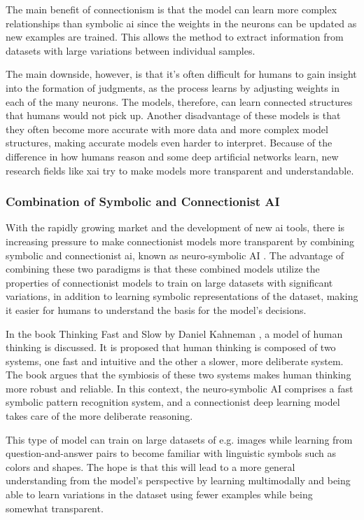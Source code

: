 The main benefit of connectionism is that the model can learn more complex relationships than symbolic \gls{ai} since the weights in the neurons can be updated as new examples are trained. This allows the method to extract information from datasets with large variations between individual samples.

The main downside, however, is that it's often difficult for humans to gain insight into the formation of judgments, as the process learns by adjusting weights in each of the many neurons. The models, therefore, can learn connected structures that humans would not pick up. Another disadvantage of these models is that they often become more accurate with more data and more complex model structures, making accurate models even harder to interpret. Because of the difference in how humans reason and some deep artificial networks learn, new research fields like \gls{xai} try to make models more transparent and understandable.


    \subsubsection{Combination of Symbolic and Connectionist AI}
    With the rapidly growing market and the development of new \gls{ai} tools, there is increasing pressure to make connectionist models more transparent by combining symbolic and connectionist \gls{ai}, known as neuro-symbolic AI \cite{valiantKnowledgeInfusionPursuit2008}. The advantage of combining these two paradigms is that these combined models utilize the properties of connectionist models to train on large datasets with significant variations, in addition to learning symbolic representations of the dataset, making it easier for humans to understand the basis for the model's decisions.

    In the book Thinking Fast and Slow by Daniel Kahneman \cite{kahnemanThinkingFastSlow2013}, a model of human thinking is discussed. It is proposed that human thinking is composed of two systems, one fast and intuitive and the other a slower, more deliberate system. The book argues that the symbiosis of these two systems makes human thinking more robust and reliable. In this context, the neuro-symbolic AI comprises a fast symbolic pattern recognition system, and a connectionist deep learning model takes care of the more deliberate reasoning.  
    
    This type of model can train on large datasets of e.g. images while learning from question-and-answer pairs to become familiar with linguistic symbols such as colors and shapes. The hope is that this will lead to a more general understanding from the model's perspective by learning multimodally and being able to learn variations in the dataset using fewer examples while being somewhat transparent.
    
